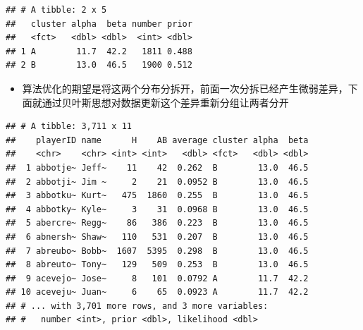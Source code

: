 \documentclass[
]{book}
\newenvironment{Shaded}{\begin{snugshade}}{\end{snugshade}}
\newcommand{\CommentTok}[1]{\textcolor[rgb]{0.56,0.35,0.01}{\textit{#1}}}
\newcommand{\DataTypeTok}[1]{\textcolor[rgb]{0.13,0.29,0.53}{#1}}
\newcommand{\DecValTok}[1]{\textcolor[rgb]{0.00,0.00,0.81}{#1}}
\newcommand{\KeywordTok}[1]{\textcolor[rgb]{0.13,0.29,0.53}{\textbf{#1}}}
\newcommand{\NormalTok}[1]{#1}
\newcommand{\OperatorTok}[1]{\textcolor[rgb]{0.81,0.36,0.00}{\textbf{#1}}}
\newcommand{\StringTok}[1]{\textcolor[rgb]{0.31,0.60,0.02}{#1}}
\providecommand{\tightlist}{%
  \setlength{\itemsep}{0pt}\setlength{\parskip}{0pt}}
\begin{document}
\begin{verbatim}
## # A tibble: 2 x 5
##   cluster alpha  beta number prior
##   <fct>   <dbl> <dbl>  <int> <dbl>
## 1 A        11.7  42.2   1811 0.488
## 2 B        13.0  46.5   1900 0.512
\end{verbatim}

\begin{itemize}
\tightlist
\item
  算法优化的期望是将这两个分布分拆开，前面一次分拆已经产生微弱差异，下面就通过贝叶斯思想对数据更新这个差异重新分组让两者分开
\end{itemize}

\begin{Shaded}
\end{Shaded}

\begin{verbatim}
## # A tibble: 3,711 x 11
##    playerID name      H    AB average cluster alpha  beta
##    <chr>    <chr> <int> <int>   <dbl> <fct>   <dbl> <dbl>
##  1 abbotje~ Jeff~    11    42  0.262  B        13.0  46.5
##  2 abbotji~ Jim ~     2    21  0.0952 B        13.0  46.5
##  3 abbotku~ Kurt~   475  1860  0.255  B        13.0  46.5
##  4 abbotky~ Kyle~     3    31  0.0968 B        13.0  46.5
##  5 abercre~ Regg~    86   386  0.223  B        13.0  46.5
##  6 abnersh~ Shaw~   110   531  0.207  B        13.0  46.5
##  7 abreubo~ Bobb~  1607  5395  0.298  B        13.0  46.5
##  8 abreuto~ Tony~   129   509  0.253  B        13.0  46.5
##  9 acevejo~ Jose~     8   101  0.0792 A        11.7  42.2
## 10 aceveju~ Juan~     6    65  0.0923 A        11.7  42.2
## # ... with 3,701 more rows, and 3 more variables:
## #   number <int>, prior <dbl>, likelihood <dbl>
\end{verbatim}
\end{document}
